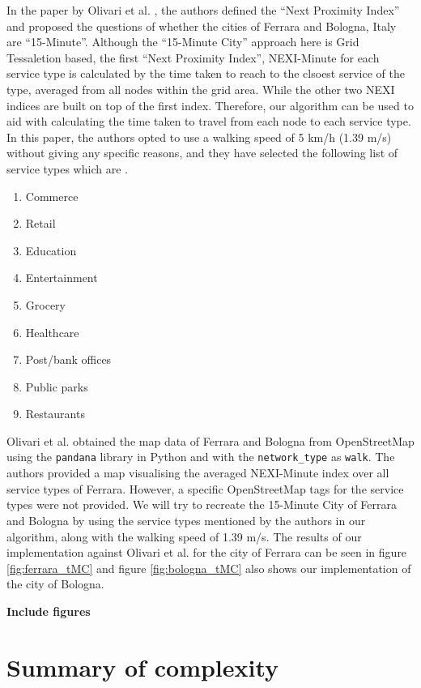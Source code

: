 In the paper by Olivari et al. \cite{olivari_are_2023}, the authors defined the ``Next Proximity Index'' and proposed the questions of whether the cities of Ferrara and Bologna, Italy are ``15-Minute''. Although the ``15-Minute City'' approach here is Grid Tessaletion based, the first ``Next Proximity Index'', NEXI-Minute for each service type is calculated by the time taken to reach to the clsoest service of the type, averaged from all nodes within the grid area. While the other two NEXI indices are built on top of the first index. Therefore, our algorithm can be used to aid with calculating the time taken to travel from each node to each service type. In this paper, the authors opted to use a walking speed of 5 km/h (1.39 m/s) without giving any specific reasons, and they have selected the following list of service types which are  \cite{walkscore}.

\begin{enumerate}
    \item Commerce
    \item Retail
    \item Education
    \item Entertainment
    \item Grocery
    \item Healthcare
    \item Post/bank offices
    \item Public parks
    \item Restaurants
\end{enumerate}

Olivari et al. obtained the map data of Ferrara and Bologna from OpenStreetMap using the \verb|pandana| library in Python and with the \verb|network_type| as \verb|walk|. The authors provided a map visualising the averaged NEXI-Minute index over all service types of Ferrara. However, a specific OpenStreetMap tags for the service types were not provided. We will try to recreate the 15-Minute City of Ferrara and Bologna by using the service types mentioned by the authors in our algorithm, along with the walking speed of 1.39 m/s. The results of our implementation against Olivari et al. for the city of Ferrara can be seen in figure \ref{fig:ferrara_tMC} and figure \ref{fig:bologna_tMC} also shows our implementation of the city of Bologna.

\textbf{Include figures}

\section{Summary of complexity}

